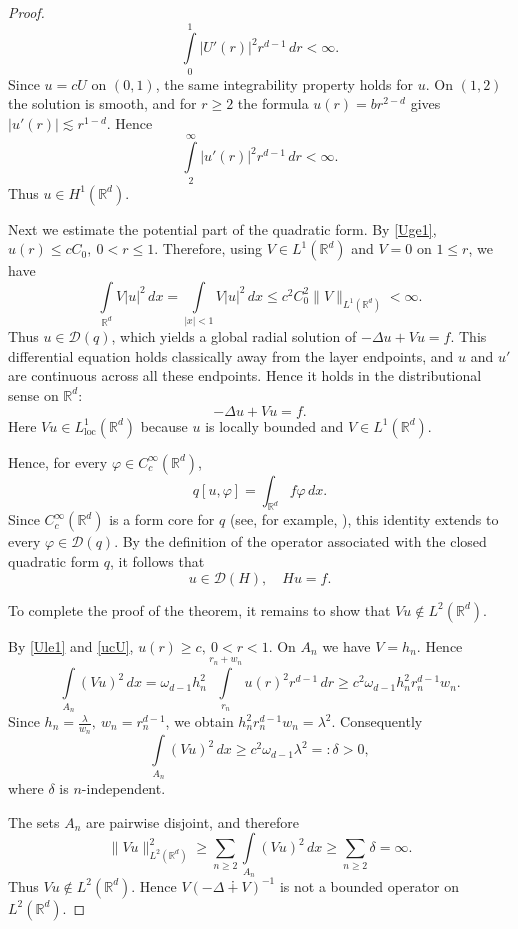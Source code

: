\documentclass[11pt,reqno]{amsart}
\newcommand{\R}{{\mathbb R}}
\begin{document}
\begin{proof}
$$\int\limits_0^1|U'(r)|^2r^{d-1}\,dr<\infty.$$
Since $u=cU$ on $(0,1)$, the same integrability property holds for $u$.
On $(1,2)$ the solution is smooth, and for $r\ge 2$ the formula $u(r)=br^{2-d}$ gives $|u'(r)|\lesssim r^{1-d}$. Hence
$$\int\limits_2^\infty|u'(r)|^2r^{d-1}\,dr<\infty.$$
Thus $u\in H^1(\R^d)$.
\par
Next we estimate the potential part of the quadratic form. By \eqref{Uge1}, $u(r)\le cC_0,\  0<r\le 1$.
Therefore, using $V\in L^1(\R^d)$ and $V=0$ on $1\le r$, we have
$$\int\limits_{\R^d}V|u|^2\,dx =\int\limits_{|x|<1}V|u|^2\,dx\le c^2C_0^2\|V\|_{L^1(\R^d)}<\infty.$$
Thus $u\in \mathcal{D}(q)$, which yields a global radial solution of
$-\Delta u+Vu=f$. This differential equation holds classically away from the layer endpoints, and $u$ and $u'$ are continuous across all these endpoints. Hence it holds in the distributional sense on $\R^d$:
\begin{equation}\label{Distributional}
-\Delta u+Vu=f.
\end{equation}
Here $Vu\in L^1_{\mathrm{loc}}(\R^d)$ because $u$ is locally bounded and $V\in L^1(\R^d)$.
\par
Hence, for every $\varphi\in C_c^\infty(\R^d)$,
$$q[u,\varphi]=\int_{\R^d}f\varphi\,dx.$$
Since $C_c^\infty(\mathbb R^d)$ is a form core for $q$ (see, for example, \cite[Theorem 2.1]{Simon1}), this identity extends to every $\varphi\in\mathcal D(q)$. By the definition of the operator associated with the closed quadratic form $q$, it follows that
$$u\in\mathcal D(H),\quad Hu=f.$$
\par\medskip
To complete the proof of the theorem, it remains to show that $Vu\notin L^2(\R^d)$.
\par
By \eqref{Ule1} and \eqref{ucU}, $u(r)\ge c,\  0<r<1$. On $A_n$ we have $V=h_n$. Hence
$$\int\limits_{A_n}(Vu)^2\,dx = \omega_{d-1}h_n^2 \int\limits_{r_n}^{r_n+w_n}u(r)^2r^{d-1}\,dr\ge c^2\omega_{d-1}h_n^2r_n^{d-1}w_n.$$
Since $h_n=\frac{\lambda}{w_n},\  w_n=r_n^{d-1}$, we obtain $h_n^2r_n^{d-1}w_n=\lambda^2$.
Consequently
$$\int\limits_{A_n}(Vu)^2\,dx\ge c^2\omega_{d-1}\lambda^2=:\delta>0,$$
where $\delta$ is $n$-independent.
\par
The sets $A_n$ are pairwise disjoint, and therefore
$$\|Vu\|_{L^2(\R^d)}^2\ge\sum_{n\ge 2}\int\limits_{A_n}(Vu)^2\,dx\ge\sum_{n\ge 2}\delta=\infty.$$
Thus $Vu\notin L^2(\R^d)$. Hence $V(-\Delta\dotplus V)^{-1}$ is not a bounded operator on $L^2(\R^d)$.
\end{proof}
\end{document}
